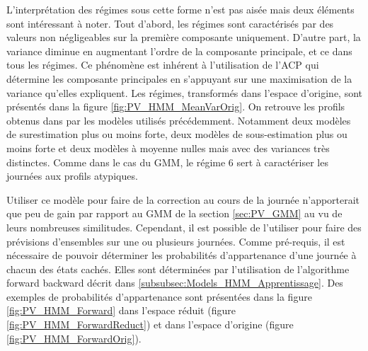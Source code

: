 \documentclass[12pt]{report}
\begin{document}
L'interprétation des régimes sous cette forme n'est pas aisée mais deux éléments sont intéressant à noter. Tout d'abord, les régimes sont caractérisés par des valeurs non négligeables sur la première composante uniquement. D'autre part, la variance diminue en augmentant l'ordre de la composante principale, et ce dans tous les régimes. Ce phénomène est inhérent à l'utilisation de l'ACP qui détermine les composante principales en s'appuyant sur une maximisation de la variance qu'elles expliquent. Les régimes, transformés dans l'espace d'origine, sont présentés dans la figure \ref{fig:PV_HMM_MeanVarOrig}. On retrouve les profils obtenus dans par les modèles utilisés précédemment. Notamment deux modèles de surestimation plus ou moins forte, deux modèles de sous-estimation plus ou moins forte et deux modèles à moyenne nulles mais avec des variances très distinctes. Comme dans le cas du GMM, le régime 6 sert à caractériser les journées aux profils atypiques. 



Utiliser ce modèle pour faire de la correction au cours de la journée n'apporterait que peu de gain par rapport au GMM de la section \ref{sec:PV_GMM} au vu de leurs nombreuses similitudes. Cependant, il est possible de l'utiliser pour faire des prévisions d'ensembles sur une ou plusieurs journées. Comme pré-requis, il est nécessaire de pouvoir déterminer les probabilités d'appartenance d'une journée à chacun des états cachés. Elles sont déterminées par l'utilisation de l'algorithme forward backward décrit dans \ref{subsubsec:Models_HMM_Apprentissage}. Des exemples de probabilités d'appartenance sont présentées dans la figure \ref{fig:PV_HMM_Forward} dans l'espace réduit (figure \ref{fig:PV_HMM_ForwardReduct}) et dans l'espace d'origine (figure \ref{fig:PV_HMM_ForwardOrig}).
\end{document}

